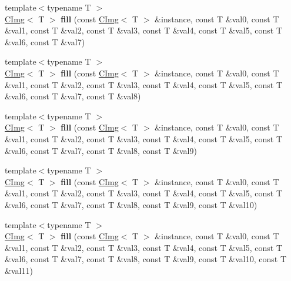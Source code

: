 \begin{DoxyCompactItemize}
\item 
\hypertarget{namespacecimg__library_a96a289ac79aa29110475d097d16e4dda}{{\footnotesize template$<$typename T $>$ }\\\hyperlink{structcimg__library_1_1_c_img}{C\-Img}$<$ T $>$ {\bfseries fill} (const \hyperlink{structcimg__library_1_1_c_img}{C\-Img}$<$ T $>$ \&instance, const T \&val0, const T \&val1, const T \&val2, const T \&val3, const T \&val4, const T \&val5, const T \&val6, const T \&val7)}\label{namespacecimg__library_a96a289ac79aa29110475d097d16e4dda}

\item 
\hypertarget{namespacecimg__library_ab61718ba80dbdc3034cb07eec2bf3a81}{{\footnotesize template$<$typename T $>$ }\\\hyperlink{structcimg__library_1_1_c_img}{C\-Img}$<$ T $>$ {\bfseries fill} (const \hyperlink{structcimg__library_1_1_c_img}{C\-Img}$<$ T $>$ \&instance, const T \&val0, const T \&val1, const T \&val2, const T \&val3, const T \&val4, const T \&val5, const T \&val6, const T \&val7, const T \&val8)}\label{namespacecimg__library_ab61718ba80dbdc3034cb07eec2bf3a81}

\item 
\hypertarget{namespacecimg__library_a65603d1711e04f67f46fec2e436d1c8b}{{\footnotesize template$<$typename T $>$ }\\\hyperlink{structcimg__library_1_1_c_img}{C\-Img}$<$ T $>$ {\bfseries fill} (const \hyperlink{structcimg__library_1_1_c_img}{C\-Img}$<$ T $>$ \&instance, const T \&val0, const T \&val1, const T \&val2, const T \&val3, const T \&val4, const T \&val5, const T \&val6, const T \&val7, const T \&val8, const T \&val9)}\label{namespacecimg__library_a65603d1711e04f67f46fec2e436d1c8b}

\item 
\hypertarget{namespacecimg__library_a39d88e5394559a26efcb5ff520875da5}{{\footnotesize template$<$typename T $>$ }\\\hyperlink{structcimg__library_1_1_c_img}{C\-Img}$<$ T $>$ {\bfseries fill} (const \hyperlink{structcimg__library_1_1_c_img}{C\-Img}$<$ T $>$ \&instance, const T \&val0, const T \&val1, const T \&val2, const T \&val3, const T \&val4, const T \&val5, const T \&val6, const T \&val7, const T \&val8, const T \&val9, const T \&val10)}\label{namespacecimg__library_a39d88e5394559a26efcb5ff520875da5}

\item 
\hypertarget{namespacecimg__library_aac926dbc2851a6b974c8899f9e67607a}{{\footnotesize template$<$typename T $>$ }\\\hyperlink{structcimg__library_1_1_c_img}{C\-Img}$<$ T $>$ {\bfseries fill} (const \hyperlink{structcimg__library_1_1_c_img}{C\-Img}$<$ T $>$ \&instance, const T \&val0, const T \&val1, const T \&val2, const T \&val3, const T \&val4, const T \&val5, const T \&val6, const T \&val7, const T \&val8, const T \&val9, const T \&val10, const T \&val11)}\label{namespacecimg__library_aac926dbc2851a6b974c8899f9e67607a}


\end{DoxyCompactItemize}
